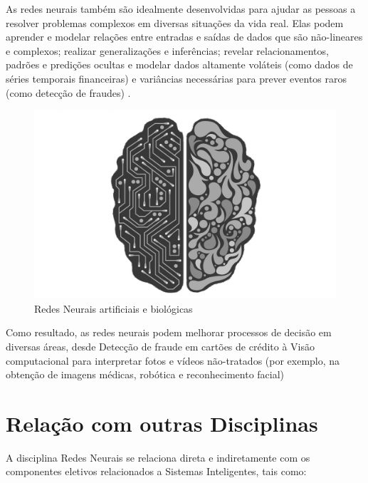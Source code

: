\documentclass{article}
\begin{document}
As redes neurais também são idealmente desenvolvidas para ajudar as pessoas a resolver problemas complexos em diversas situações da vida real. Elas podem aprender e modelar relações entre entradas e saídas de dados que são não-lineares e complexos; realizar generalizações e inferências; revelar relacionamentos, padrões e predições ocultas e modelar dados altamente voláteis (como dados de séries temporais financeiras) e variâncias necessárias para prever eventos raros (como detecção de fraudes) . \citep{Importancia}

\begin{figure}[h]
\centering
\includegraphics[scale=0.2]{cerebro}
\caption{Redes Neurais artificiais e biológicas\citep{Figura2}}
\label{figura_2}
\end{figure}

Como resultado, as redes neurais podem melhorar processos de decisão em diversas áreas, desde Detecção de fraude em cartões de crédito à Visão computacional para interpretar fotos e vídeos não-tratados (por exemplo, na obtenção de imagens médicas, robótica e reconhecimento facial)


\section{Relação com outras Disciplinas}

A disciplina Redes Neurais se relaciona direta e indiretamente com os componentes eletivos relacionados a Sistemas Inteligentes, tais como:
\end{document}
